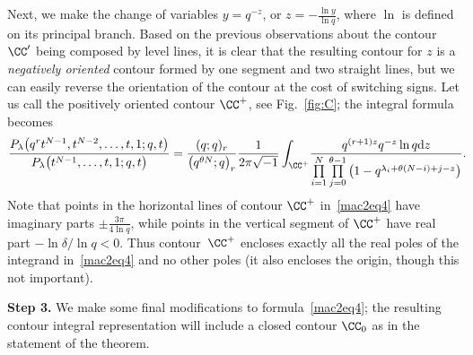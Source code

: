 Next, we make the change of variables $y = q^{-z}$, or $z = -\frac{\ln{y}}{\ln{q}}$, where $\ln$ is def\/ined on its principal branch. Based on the previous observations about the contour $\CC'$ being composed by level lines, it is clear that the resulting contour for $z$ is a \textit{negatively oriented} contour formed by one segment and two straight lines, but we can easily reverse the orientation of the contour at the cost of switching signs. Let us call the positively oriented contour $\CC^+$, see Fig.~\ref{fig:C}; the integral formula becomes
\begin{gather}\label{mac2eq4}
\frac{P_{\lambda}\big(q^rt^{N-1}, t^{N-2}, \dots, t, 1; q, t\big)}{P_{\lambda}\big(t^{N-1}, \dots, t, 1; q, t\big)} = \frac{(q; q)_r}{\big(q^{\theta N}; q\big)_r}\frac{1}{2\pi\sqrt{-1}}\int_{\CC^+}\!
{\frac{q^{(r+1)z} q^{-z}\ln{q} {\rm d}z}{\prod\limits_{i=1}^N{\prod\limits_{j=0}^{\theta-1}{\big(1 - q^{\lambda_i + \theta(N - i) + j- z}\big)}}}}.\!\!\!\!
\end{gather}
Note that points in the horizontal lines of contour $\CC^+$ in~\eqref{mac2eq4} have imaginary parts $\pm\frac{3\pi}{4\ln{q}}$, while points in the vertical segment of $\CC^+$ have real part $-\ln{\delta}/\ln{q} < 0$. Thus contour~$\CC^+$ encloses exactly all the real poles of the integrand in~\eqref{mac2eq4} and no other poles (it also encloses the origin, though this not important).

\textbf{Step 3.} We make some f\/inal modif\/ications to formula~\eqref{mac2eq4}; the resulting contour integral representation will include a closed contour $\CC_0$ as in the statement of the theorem.

